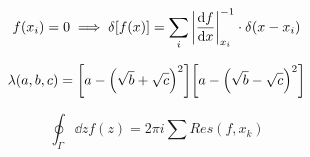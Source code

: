 \begin{equation*}
        f(x_i) = 0
        \implies
        \Ddelta[f(x)] = \sum_{i} \abs{\dv{f}{x}}_{x_i}^{-1}\cdot\Ddelta(x-x_i)
\end{equation*}

\begin{equation*}
        \lambda(a,b,c) = \qty[a - \qty(\sqrt{b} + \sqrt{c})^2]\qty[a - \qty(\sqrt{b} - \sqrt{c})^2]
\end{equation*}

\begin{equation*}
        \oint_\Gamma\dd{z} f(z) = 2\pi i \sum Res(f,x_k)
\end{equation*}

